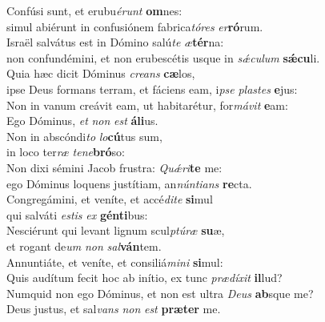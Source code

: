 \evenverse Confúsi sunt, et erubu\textit{é}\textit{runt} \textbf{om}nes:~\*\\
\evenverse simul abiérunt in confusiónem fabrica\textit{tó}\textit{res} \textit{er}\textbf{ró}rum.\\
\oddverse Israël salvátus est in Dómino salú\textit{te} \textit{æ}\textbf{tér}na:~\*\\
\oddverse non confundémini, et non erubescétis usque in \textit{sǽ}\textit{cu}\textit{lum} \textbf{sǽ}\textbf{cu}li.\\
\evenverse Quia hæc dicit Dóminus \textit{cre}\textit{ans} \textbf{cæ}los,~\*\\
\evenverse ipse Deus formans terram, et fáciens eam, i\textit{pse} \textit{pla}\textit{stes} \textbf{e}jus:\\
\oddverse Non in vanum creávit eam, ut habitarétur, for\textit{má}\textit{vit} \textbf{e}am:~\*\\
\oddverse Ego Dóminus, \textit{et} \textit{non} \textit{est} \textbf{á}\textbf{li}us.\\
\evenverse Non in abscóndi\textit{to} \textit{lo}\textbf{cú}tus sum,~\*\\
\evenverse in loco ter\textit{ræ} \textit{te}\textit{ne}\textbf{bró}so:\\
\oddverse Non dixi sémini Jacob frustra: \textit{Quǽ}\textit{ri}\textbf{te} me:~\*\\
\oddverse ego Dóminus loquens justítiam, an\textit{nún}\textit{ti}\textit{ans} \textbf{re}cta.\\
\evenverse Congregámini, et veníte, et accé\textit{di}\textit{te} \textbf{si}mul~\*\\
\evenverse qui salváti \textit{e}\textit{stis} \textit{ex} \textbf{gén}\textbf{ti}bus:\\
\oddverse Nesciérunt qui levant lignum scul\textit{ptú}\textit{ræ} \textbf{su}æ,~\*\\
\oddverse et rogant de\textit{um} \textit{non} \textit{sal}\textbf{ván}tem.\\
\evenverse Annuntiáte, et veníte, et consiliá\textit{mi}\textit{ni} \textbf{si}mul:~\*\\
\evenverse Quis audítum fecit hoc ab inítio, ex tunc \textit{præ}\textit{dí}\textit{xit} \textbf{il}lud?\\
\oddverse Numquid non ego Dóminus, et non est ultra \textit{De}\textit{us} \textbf{ab}sque me?~\*\\
\oddverse Deus justus, et sal\textit{vans} \textit{non} \textit{est} \textbf{præ}\textbf{ter} me.\\
